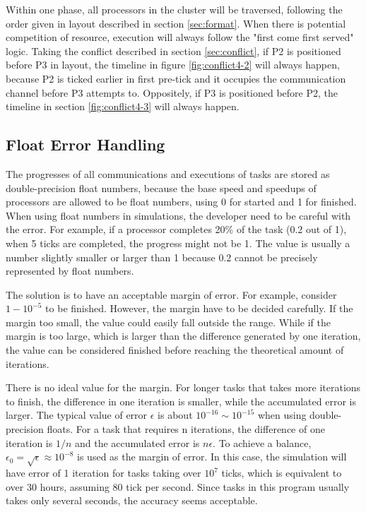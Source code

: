 \documentclass[msc,deptreport, cs]{infthesis}
\begin{document}
Within one phase, all processors in the cluster will be traversed, following the order given in layout described in section \ref{sec:format}. When there is potential competition of resource, execution will always follow the "first come first served" logic. Taking the conflict described in section \ref{sec:conflict}, if P2 is positioned before P3 in layout, the timeline in figure \ref{fig:conflict4-2} will always happen, because P2 is ticked earlier in first pre-tick and it occupies the communication channel before P3 attempts to. Oppositely, if P3 is positioned before P2, the timeline in section \ref{fig:conflict4-3} will always happen.

\subsection{Float Error Handling}

The progresses of all communications and executions of tasks are stored as double-precision float numbers, because the base speed and speedups of processors are allowed to be float numbers, using 0 for started and 1 for finished. When using float numbers in simulations, the developer need to be careful with the error. For example, if a processor completes 20\% of the task (0.2 out of 1), when 5 ticks are completed, the progress might not be 1. The value is usually a number slightly smaller or larger than 1 because 0.2 cannot be precisely represented by float numbers.

The solution is to have an acceptable margin of error. For example, consider $1 - 10^{-5}$ to be finished. However, the margin have to be decided carefully. If the margin too small, the value could easily fall outside the range. While if the margin is too large, which is larger than the difference generated by one iteration, the value can be considered finished before reaching the theoretical amount of iterations.

There is no ideal value for the margin. For longer tasks that takes more iterations to finish, the difference in one iteration is smaller, while the accumulated error is larger. The typical value of error $\epsilon$ is about $10^{-16} \sim 10^{-15}$ when using double-precision floats. For a task that requires n iterations, the difference of one iteration is $1/n$ and the accumulated error is $n\epsilon$. To achieve a balance, $\epsilon_0 = \sqrt{\epsilon} \approx 10^{-8}$ is used as the margin of error. In this case, the simulation will have error of 1 iteration for tasks taking over $10^7$ ticks, which is equivalent to over 30 hours, assuming 80 tick per second. Since tasks in this program usually takes only several seconds, the accuracy seems acceptable.
\end{document}
